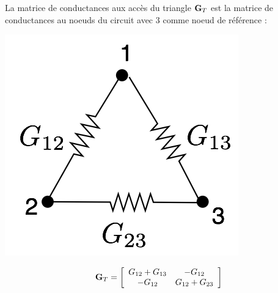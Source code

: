 \begin{testexample}
La matrice de conductances aux accès du triangle ${\bf G}_T$ est la matrice de conductances au noeuds du circuit avec $3$ comme
noeud de référence :
\begin{center}
\begin{minipage}[c]{0.33 \textwidth}
	\begin{center}
	\includegraphics[width=0.9\linewidth]{figs/methodes-generales/e2t_2}
	\end{center}
\end{minipage}
\begin{minipage}[c]{0.66 \textwidth}
	\[{\bf G}_T=
	\left[
	\begin{array}{cc}
	G_{12}+G_{13} & -G_{12}\\
	-G_{12} & G_{12}+G_{23}
	\end{array} \right]\]
\end{minipage}
\end{center}


\end{testexample}
